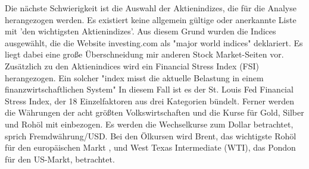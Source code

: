 \newline
Die nächste Schwierigkeit ist die Auswahl der Aktienindizes, die für die Analyse herangezogen werden. Es existiert keine allgemein gültige oder anerkannte Liste mit 'den wichtigsten Aktienindizes'. Aus diesem Grund wurden die Indices ausgewählt, die die Website investing.com als "major world indices" deklariert.\citep{fusion_media_limited_major_2017} Es liegt dabei eine große Überschneidung mir anderen Stock Market-Seiten vor. Zusätzlich zu den Aktienindices wird ein Financial Stress Index (FSI) herangezogen. Ein solcher "index misst die aktuelle Belastung in einem finanzwirtschaftlichen System"\citep[S.~1;eigene Übersetzung]{vermeulen_financial_2014} In diesem Fall ist es der St. Louis Fed Financial Stress Index, der 18 Einzelfaktoren aus drei Kategorien bündelt.\citep{federal_reserve_bank_of_st._louis_st._2017}
\newline
Ferner werden die Währungen der acht größten Volkswirtschaften\citep{the_international_monetary_fund_world_2017} und die Kurse für Gold, Silber und Rohöl mit einbezogen. Es werden die Wechselkurse zum Dollar betrachtet, sprich Fremdwährung/USD. Bei den Ölkursen wird Brent, das wichtigste Rohöl für den europäischen Markt \citep{noauthor_brent_2016}, und West Texas Intermediate (WTI), das Pondon für den US-Markt, betrachtet\citep{noauthor_west_2017}.

